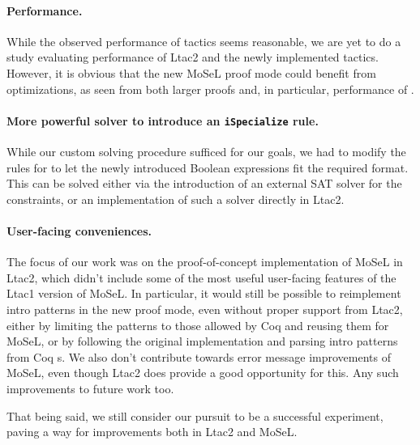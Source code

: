\paragraph{Performance.}
  While the observed performance of tactics seems reasonable, we are yet to do a study evaluating performance of Ltac2 and the newly implemented tactics.
  However, it is obvious that the new MoSeL proof mode could benefit from optimizations, as seen from both larger proofs and, in particular, performance of .
\paragraph{More powerful solver to introduce an \texttt{iSpecialize} rule.}
  While our custom solving procedure sufficed for our goals, we had to modify the rules for  to let the newly introduced Boolean expressions fit the required format.
  This can be solved either via the introduction of an external SAT solver for the constraints, or an implementation of such a solver directly in Ltac2.
\paragraph{User-facing conveniences.}
  The focus of our work was on the proof-of-concept implementation of MoSeL in Ltac2, which didn't include some of the most useful user-facing features of the Ltac1 version of MoSeL.
  In particular, it would still be possible to reimplement intro patterns in the new proof mode, even without proper support from Ltac2, either by limiting the patterns to those allowed by Coq and reusing them for MoSeL, or by following the original implementation and parsing intro patterns from Coq s.
  We also don't contribute towards error message improvements of MoSeL, even though Ltac2 does provide a good opportunity for this. Any such improvements to future work too.

That being said, we still consider our pursuit to be a successful experiment, paving a way for improvements both in Ltac2 and MoSeL.

